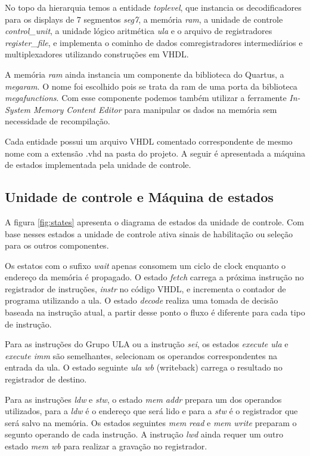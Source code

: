 \documentclass[a4paper, 12pt]{article}
\begin{document}
\par
No topo da hierarquia temos a entidade \textit{toplevel}, que instancia os decodificadores para
os displays de 7 segmentos \textit{seg7}, a memória \textit{ram}, a unidade de controle
\textit{control\_unit}, a unidade lógico aritmética \textit{ula} e o arquivo de registradores
\textit{register\_file}, e implementa o cominho de dados comregistradores intermediários
e multiplexadores utilizando construções em VHDL.

\par
A memória \textit{ram} ainda instancia um componente da biblioteca
do Quartus, a \textit{megaram}. O nome foi escolhido pois se trata da
ram de uma porta da biblioteca \textit{megafunctions}. Com esse componente
podemos também utilizar a ferramente \textit{In-System Memory Content Editor} para
manipular os dados na memória sem necessidade de recompilação.

\par
Cada entidade possui um arquivo VHDL comentado correspondente de mesmo nome com a extensão .vhd na pasta do projeto.
A seguir é apresentada a máquina de estados implementada pela unidade de controle.

\subsection{Unidade de controle e Máquina de estados}

A figura \ref{fig:states} apresenta o diagrama de estados da unidade de controle.
Com base nesses estados a unidade de controle ativa sinais de habilitação ou seleção
para os outros componentes.

Os estatos com o sufixo \textit{wait} apenas consomem um ciclo de clock enquanto o endereço da memória é propagado.
O estado \textit{fetch} carrega a próxima instrução no registrador de instruções, \textit{instr} no código VHDL,
e incrementa o contador de programa utilizando a ula.
O estado \textit{decode} realiza uma tomada de decisão baseada na instrução atual, a partir desse ponto o fluxo 
é diferente para cada tipo de instrução.

Para as instruções do Grupo ULA ou a instrução \textit{sei}, os estados \textit{execute ula} e \textit{execute imm} são semelhantes,
selecionam os operandos correspondentes na entrada da ula. O estado seguinte \textit{ula wb} (writeback) carrega o resultado no registrador
de destino. 

Para as instruções \textit{ldw} e \textit{stw}, o estado \textit{mem addr} prepara um dos operandos utilizados,
para a \textit{ldw} é o endereço que será lido e para a \textit{stw} é o registrador que será salvo na memória.
Os estados seguintes \textit{mem read} e \textit{mem write} preparam o segunto operando de cada instrução.
A instrução \textit{lwd} ainda requer um outro estado \textit{mem wb} para realizar a gravação no registrador.
\end{document}
